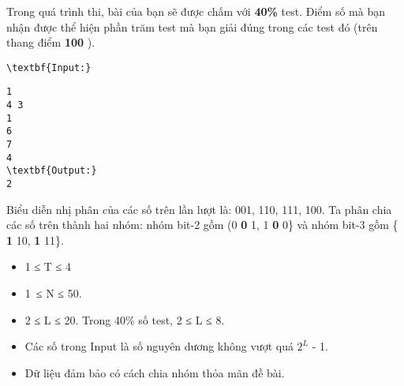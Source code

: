 Trong quá trình thi, bài của bạn sẽ được chấm với   \textbf{    40\%   }   test. Điểm số mà bạn nhận được thể hiện phần trăm test mà bạn giải đúng trong các test đó (trên thang điểm   \textbf{    100   }   ).
\begin{verbatim}
\textbf{Input:}\end{verbatim}
\begin{verbatim}
1
4 3
1
6
7
4
\textbf{Output:}
2
\end{verbatim}
Biểu diễn nhị phân của các số trên lần lượt là: 001, 110, 111, 100. Ta phân chia các số trên thành hai nhóm: nhóm bit-2 gồm (0   \textbf{    0   }   1, 1   \textbf{    0   }   0\} và nhóm bit-3 gồm \{   \textbf{    1   }   10,   \textbf{    1   }   11\}.
\begin{itemize}
	\item     1 ≤ T ≤ 4   
	\item     1 ≤ N ≤ 50.   
	\item     2 ≤ L ≤ 20. Trong 40\% số test, 2 ≤ L ≤ 8.   
	\item     Các số trong Input là số nguyên dương không vượt quá $2^{L}$    - 1.   
	\item     Dữ liệu đảm bảo có cách chia nhóm thỏa mãn đề bài.   
\end{itemize}